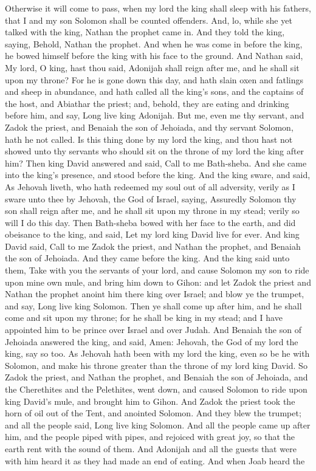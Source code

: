 Otherwise it will come to pass, when my lord the king shall sleep with his fathers, that I and my son Solomon shall be counted offenders.  And, lo, while she yet talked with the king, Nathan the prophet came in. And they told the king, saying, Behold, Nathan the prophet. And when he was come in before the king, he bowed himself before the king with his face to the ground. And Nathan said, My lord, O king, hast thou said, Adonijah shall reign after me, and he shall sit upon my throne? For he is gone down this day, and hath slain oxen and fatlings and sheep in abundance, and hath called all the king’s sons, and the captains of the host, and Abiathar the priest; and, behold, they are eating and drinking before him, and say, Long live king Adonijah. But me, even me thy servant, and Zadok the priest, and Benaiah the son of Jehoiada, and thy servant Solomon, hath he not called. Is this thing done by my lord the king, and thou hast not showed unto thy servants who should sit on the throne of my lord the king after him?  Then king David answered and said, Call to me Bath-sheba. And she came into the king’s presence, and stood before the king. And the king sware, and said, As Jehovah liveth, who hath redeemed my soul out of all adversity, verily as I sware unto thee by Jehovah, the God of Israel, saying, Assuredly Solomon thy son shall reign after me, and he shall sit upon my throne in my stead; verily so will I do this day. Then Bath-sheba bowed with her face to the earth, and did obeisance to the king, and said, Let my lord king David live for ever.  And king David said, Call to me Zadok the priest, and Nathan the prophet, and Benaiah the son of Jehoiada. And they came before the king. And the king said unto them, Take with you the servants of your lord, and cause Solomon my son to ride upon mine own mule, and bring him down to Gihon: and let Zadok the priest and Nathan the prophet anoint him there king over Israel; and blow ye the trumpet, and say, Long live king Solomon. Then ye shall come up after him, and he shall come and sit upon my throne; for he shall be king in my stead; and I have appointed him to be prince over Israel and over Judah. And Benaiah the son of Jehoiada answered the king, and said, Amen: Jehovah, the God of my lord the king, say so too. As Jehovah hath been with my lord the king, even so be he with Solomon, and make his throne greater than the throne of my lord king David.  So Zadok the priest, and Nathan the prophet, and Benaiah the son of Jehoiada, and the Cherethites and the Pelethites, went down, and caused Solomon to ride upon king David’s mule, and brought him to Gihon. And Zadok the priest took the horn of oil out of the Tent, and anointed Solomon. And they blew the trumpet; and all the people said, Long live king Solomon. And all the people came up after him, and the people piped with pipes, and rejoiced with great joy, so that the earth rent with the sound of them.  And Adonijah and all the guests that were with him heard it as they had made an end of eating. And when Joab heard the 